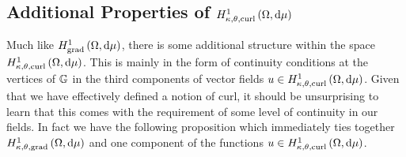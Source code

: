 \subsection{Additional Properties of $H^1_{\kappa,\theta,\mathrm{curl}}\left( \Omega, \mathrm{d}\mu \right)$} \label{sec:ktcurlSobExtraProperties}
Much like $H^1_\mathrm{grad}\left( \Omega, \mathrm{d}\mu \right)$, there is some additional structure within the space $H^1_{\kappa,\theta,\mathrm{curl}}\left( \Omega, \mathrm{d}\mu \right)$.
This is mainly in the form of continuity conditions at the vertices of $\mathbb{G}$ in the third components of vector fields $u\in H^1_{\kappa,\theta,\mathrm{curl}}\left( \Omega, \mathrm{d}\mu \right)$.
Given that we have effectively defined a notion of curl, it should be unsurprising to learn that this comes with the requirement of some level of continuity in our fields.
In fact we have the following proposition which immediately ties together $H^1_{\kappa,\theta,\mathrm{grad}}\left( \Omega, \mathrm{d}\mu \right)$ and one component of the functions $u\in H^1_{\kappa,\theta,\mathrm{curl}}\left( \Omega, \mathrm{d}\mu \right)$.

